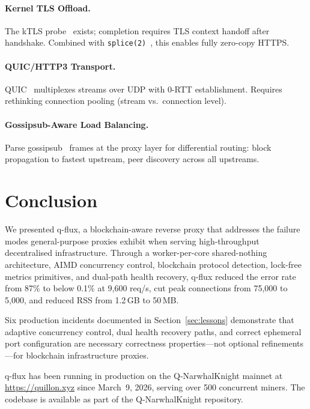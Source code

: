 \documentclass[a4paper, 11pt]{article}
\begin{document}
\paragraph{Kernel TLS Offload.}
The kTLS probe~\cite{ktls} exists; completion requires TLS context handoff after handshake. Combined with \texttt{splice(2)}~\cite{splice}, this enables fully zero-copy HTTPS.

\paragraph{QUIC/HTTP3 Transport.}
QUIC~\cite{quic} multiplexes streams over UDP with 0-RTT establishment. Requires rethinking connection pooling (stream vs.\ connection level).

\paragraph{Gossipsub-Aware Load Balancing.}
Parse gossipsub~\cite{gossipsub} frames at the proxy layer for differential routing: block propagation to fastest upstream, peer discovery across all upstreams.


\section{Conclusion}
\label{sec:conclusion}

We presented q-flux, a blockchain-aware reverse proxy that addresses the failure modes general-purpose proxies exhibit when serving high-throughput decentralised infrastructure. Through a worker-per-core shared-nothing architecture, AIMD concurrency control, blockchain protocol detection, lock-free metrics primitives, and dual-path health recovery, q-flux reduced the error rate from 87\% to below 0.1\% at 9{,}600 req/s, cut peak connections from 75{,}000 to 5{,}000, and reduced RSS from 1.2\,GB to 50\,MB.

Six production incidents documented in Section~\ref{sec:lessons} demonstrate that adaptive concurrency control, dual health recovery paths, and correct ephemeral port configuration are necessary correctness properties---not optional refinements---for blockchain infrastructure proxies.

q-flux has been running in production on the Q-NarwhalKnight mainnet at \url{https://quillon.xyz} since March~9, 2026, serving over 500 concurrent miners. The codebase is available as part of the Q-NarwhalKnight repository.
\end{document}
